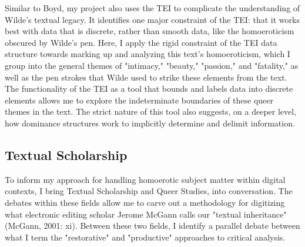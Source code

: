 \documentclass[11pt]{article}
\begin{document}
Similar to Boyd, my project also uses the TEI to complicate the
understanding of Wilde's textual legacy. It identifies one major
constraint of the TEI: that it works best with data that is discrete,
rather than smooth data, like the homoeroticism obscured by Wilde's
pen. Here, I apply the rigid constraint of the TEI data structure
towards marking up and analyzing this text's homoeroticism, which I
group into the general themes of "intimacy," "beauty," "passion," and
"fatality," as well as the pen strokes that Wilde used to strike these
elements from the text. The functionality of the TEI as a tool that
bounds and labels data into discrete elements allows me to explore the
indeterminate boundaries of these queer themes in the text. The strict
nature of this tool also suggests, on a deeper level, how dominance
structures work to implicitly determine and delimit information. 

\subsection{Textual Scholarship}
\label{sec:org2726413}

To inform my approach for handling homoerotic subject matter within
digital contexts, I bring Textual Scholarship and Queer Studies, into
conversation. The debates within these fields allow me to carve out a
methodology for digitizing what electronic editing scholar Jerome
McGann calls our "textual inheritance" (McGann, 2001: xi). Between
these two fields, I identify a parallel debate between what I term the
"restorative" and "productive" approaches to critical analysis. 
\end{document}
